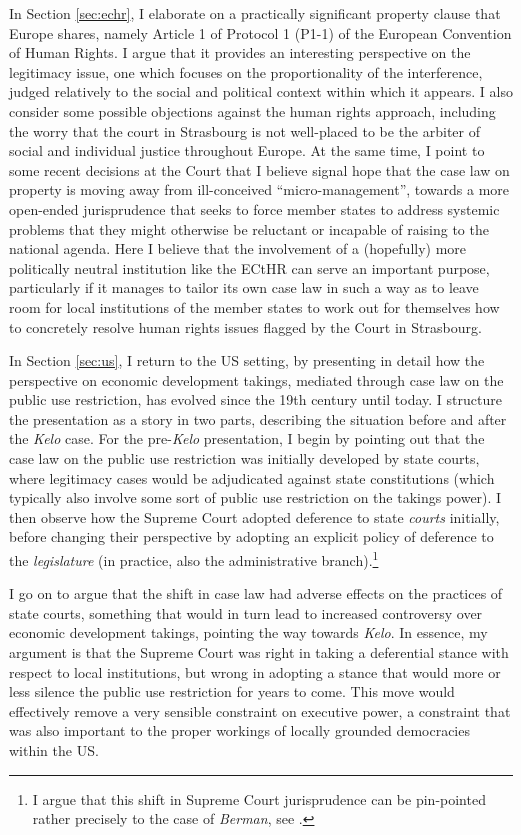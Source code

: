 In Section \ref{sec:echr}, I elaborate on a practically significant property clause that Europe shares, namely Article 1 of Protocol 1 (P1-1) of the European Convention of Human Rights. I argue that it provides an interesting perspective on the legitimacy issue, one which focuses on the proportionality of the interference, judged relatively to the social and political context within which it appears. I also consider some possible objections against the human rights approach, including the worry that the court in Strasbourg is not well-placed to be the arbiter of social and individual justice throughout Europe. At the same time, I point to some recent decisions at the Court that I believe signal hope that the case law on property is moving away from ill-conceived ``micro-management'', towards a more open-ended jurisprudence that seeks to force member states to address systemic problems that they might otherwise be reluctant or incapable of raising to the national agenda. Here I believe that the involvement of a (hopefully) more politically neutral institution like the ECtHR can serve an important purpose, particularly if it manages to tailor its own case law in such a way as to leave room for local institutions of the member states to work out for themselves how to concretely resolve human rights issues flagged by the Court in Strasbourg.

In Section \ref{sec:us}, I return to the US setting, by presenting in detail how the perspective on economic development takings, mediated through case law on the public use restriction, has evolved since the 19th century until today. I structure the presentation as a story in two parts, describing the situation before and after the {\it Kelo} case. For the pre-{\it Kelo} presentation, I begin by pointing out that the case law on the public use restriction was initially developed by state courts, where legitimacy cases would be adjudicated against state constitutions (which typically also involve some sort of public use restriction on the takings power). I then observe how the Supreme Court adopted deference to state {\it courts} initially, before changing their perspective by adopting an explicit policy of deference to the {\it legislature} (in practice, also the administrative branch).\footnote{I argue that this shift in Supreme Court jurisprudence can be pin-pointed rather precisely to the case of {\it Berman}, see \cite{berman54}.}

I go on to argue that the shift in case law had adverse effects on the practices of state courts, something that would in turn lead to increased controversy over economic development takings, pointing the way towards {\it Kelo}. In essence, my argument is that the Supreme Court was right in taking a deferential stance with respect to local institutions, but wrong in adopting a stance that would more or less silence the public use restriction for years to come. This move would effectively remove a very sensible constraint on executive power, a constraint that was also important to the proper workings of locally grounded democracies within the US.

